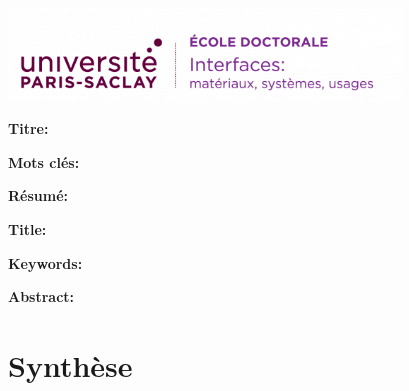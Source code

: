 \thispagestyle{empty}

\noindent 
\includegraphics[height=2.45cm]{preamble/ed-interfaces.png}
\vspace{1cm}

\small

\begin{mdframed}[linecolor=Prune,linewidth=1]
	
	\textbf{Titre:} \frenchTitle
	
	\vspace{1mm} \noindent
	\textbf{Mots clés:} \frenchKeyWords 
	
	\begin{multicols}{2}
		\textbf{Résumé:} \\
		\frenchAbstract
	\end{multicols}
	
\end{mdframed}

\vspace{1cm}
\Needspace{12cm}

\begin{mdframed}[linecolor=Prune,linewidth=1]
	
	\textbf{Title:} \englishTitle
	
	\vspace{1mm} \noindent
	\textbf{Keywords:} \englishKeyWords
	
	\begin{multicols}{2}
		\textbf{Abstract:} \\
		\englishAbstract
	\end{multicols}
\end{mdframed}




\chapter*{Synthèse}
\frenchSynthesis
